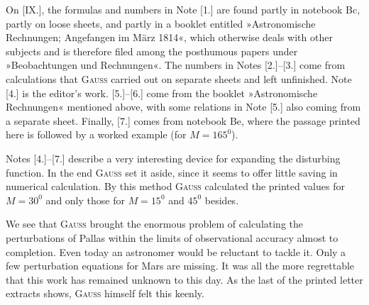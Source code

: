\par\noindent\hspace*{\parindent}On [IX.], the formulas and numbers in Note [1.] are found partly in
notebook Bc, partly on loose sheets, and partly in a booklet entitled »Astronomische Rechnungen;
Angefangen im März 1814«, which otherwise deals with other subjects
and is therefore filed among the posthumous papers under »Beobachtungen und Rechnungen«.
The numbers in Notes [2.]--[3.] come from calculations that \textsc{Gauss} carried out on separate sheets
and left unfinished. Note [4.]
is the editor's work. [5.]--[6.] come from the booklet »Astronomische Rechnungen« mentioned above,
with some relations in Note [5.] also coming from a separate sheet. Finally, [7.] comes
from notebook Be, where the passage printed here is followed by a worked example
(for \(M=165^0\)).

\par\noindent\hspace*{\parindent}Notes [4.]--[7.] describe a very interesting
device for expanding the disturbing function. In the end \textsc{Gauss}
set it aside, since it seems to offer little saving
in numerical calculation. By this method
\textsc{Gauss} calculated the printed values for \(M=30^0\) and only
those for \(M=15^0\) and \(45^0\) besides.

\medskip
\par\noindent\hspace*{\parindent}We see that \textsc{Gauss} brought the enormous problem of calculating
the perturbations of Pallas within the limits of observational accuracy almost to completion.
Even today an astronomer would be reluctant to tackle it.
Only a few perturbation equations for Mars are missing.
It was all the more regrettable that this work has remained
unknown to this day. As the last of the printed letter extracts shows,
\textsc{Gauss} himself felt this keenly.

